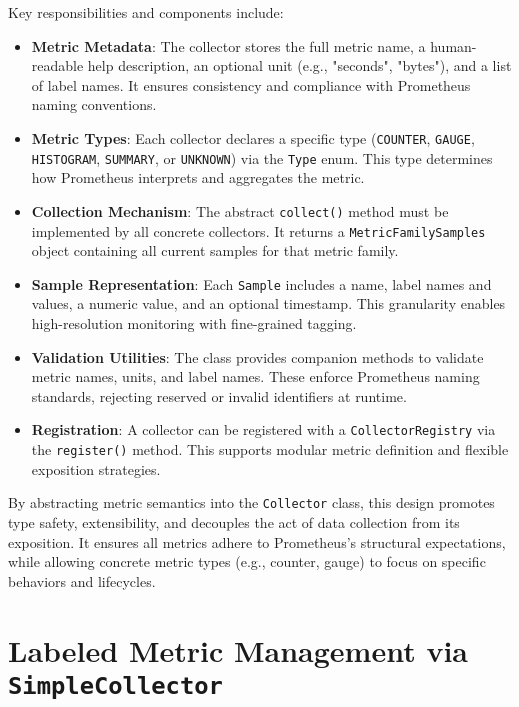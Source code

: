 Key responsibilities and components include:
\begin{itemize}
    \item \textbf{Metric Metadata}: The collector stores the full metric name, a human-readable help description, an optional unit (e.g., "seconds", "bytes"), and a list of label names. It ensures consistency and compliance with Prometheus naming conventions.
    
    \item \textbf{Metric Types}: Each collector declares a specific type (\texttt{COUNTER}, \texttt{GAUGE}, \texttt{HISTOGRAM}, \texttt{SUMMARY}, or \texttt{UNKNOWN}) via the \texttt{Type} enum. This type determines how Prometheus interprets and aggregates the metric.

    \item \textbf{Collection Mechanism}: The abstract \texttt{collect()} method must be implemented by all concrete collectors. It returns a \texttt{MetricFamilySamples} object containing all current samples for that metric family.
    
    \item \textbf{Sample Representation}: Each \texttt{Sample} includes a name, label names and values, a numeric value, and an optional timestamp. This granularity enables high-resolution monitoring with fine-grained tagging.

    \item \textbf{Validation Utilities}: The class provides companion methods to validate metric names, units, and label names. These enforce Prometheus naming standards, rejecting reserved or invalid identifiers at runtime.
    
    \item \textbf{Registration}: A collector can be registered with a \texttt{CollectorRegistry} via the \texttt{register()} method. This supports modular metric definition and flexible exposition strategies.
\end{itemize}

By abstracting metric semantics into the \texttt{Collector} class, this design promotes type safety, extensibility, and decouples the act of data collection from its exposition. It ensures all metrics adhere to Prometheus's structural expectations, while allowing concrete metric types (e.g., counter, gauge) to focus on specific behaviors and lifecycles.

\section{Labeled Metric Management via \texttt{SimpleCollector}}

